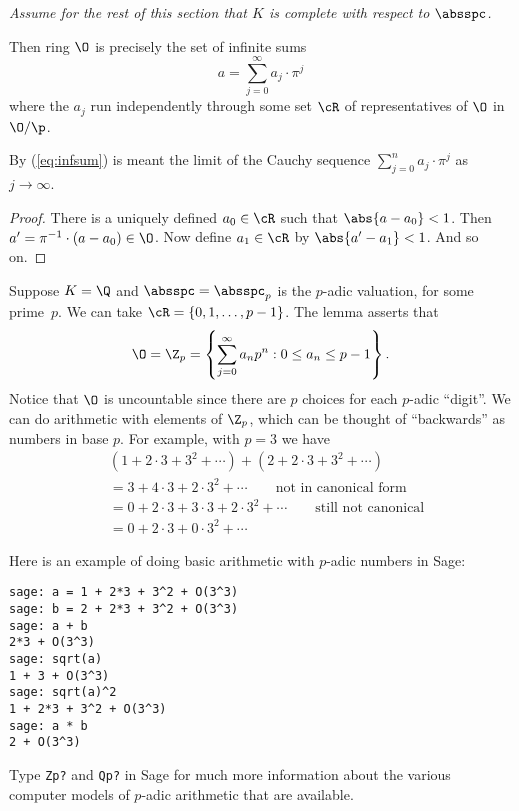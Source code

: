 \documentclass[11pt]{book}
\begin{document}
\begin{ch}
{\em Assume for the rest of this section that $K$ is complete with
  respect to $\absspc$.}
\begin{lemma}
Then ring $\O$ is precisely the set of infinite sums
\begin{equation}\label{eq:infsum}
  a = \sum_{j=0}^{\infty} a_j \cdot \pi^j
\end{equation}
where the $a_j$ run independently through some set $\cR$ of
representatives of $\O$ in $\O/\p$.
\end{lemma}
By (\ref{eq:infsum}) is meant the limit of the Cauchy sequence
$\sum_{j=0}^n a_j\cdot \pi^j$ as $j\to\infty$.
\begin{proof}
There is a uniquely defined $a_0\in \cR$ such that $\abs{a-a_0}<1$.
Then $a' = \pi^{-1}\cdot (a-a_0) \in \O$.  Now define
$a_1\in \cR$ by $\abs{a'-a_1}<1$.  And so on.
\end{proof}
\begin{example}
  Suppose $K=\Q$ and $\absspc=\absspc_p$ is the $p$-adic valuation,
  for some prime~$p$.  We can take $\cR=\{0,1,\ldots, p-1\}$.
  The lemma asserts that
  $$\O=\Z_p = \left\{ \sum_{j=0}^{\infty} a_n p^n : 0\leq a_n\leq
    p-1\right\}.$$
  Notice that $\O$ is uncountable since there are $p$
  choices for each $p$-adic ``digit''.  We can do arithmetic with
  elements of $\Z_p$, which can be thought of ``backwards'' as numbers
  in base $p$.  For example, with $p=3$ we have
  \begin{align*}
&   (1+2\cdot 3 + 3^2 + \cdots ) + (2 + 2\cdot 3 + 3^2 + \cdots ) \\
& = 3+4\cdot 3 + 2\cdot 3^2 + \cdots   \qquad \text{not in canonical form}\\
& = 0 + 2\cdot 3 + 3\cdot 3 + 2\cdot 3^2 + \cdots \qquad\text{still not canonical}\\
& = 0 + 2\cdot 3 + 0\cdot 3^2 + \cdots
\end{align*}

Here is an example of doing basic arithmetic with $p$-adic
numbers in Sage:
\begin{lstlisting}
sage: a = 1 + 2*3 + 3^2 + O(3^3)
sage: b = 2 + 2*3 + 3^2 + O(3^3)
sage: a + b
2*3 + O(3^3)
sage: sqrt(a)
1 + 3 + O(3^3)
sage: sqrt(a)^2
1 + 2*3 + 3^2 + O(3^3)
sage: a * b
2 + O(3^3)
\end{lstlisting}
Type {\tt Zp?} and {\tt Qp?} in Sage for much more information
about the various computer models of $p$-adic arithmetic that
are available.


\end{example}
\end{ch}
\end{document}
